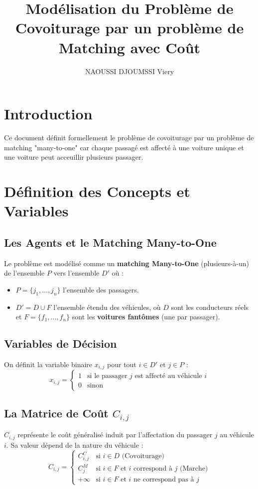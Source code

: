 \documentclass[11pt,a4paper]{article}
\title{Modélisation du Problème de Covoiturage par un problème de Matching avec Coût}
\author{NAOUSSI DJOUMSSI Viery}
\begin{document}
\maketitle

\section{Introduction}
Ce document définit formellement le problème de covoiturage par un problème de matching "many-to-one" car chaque passagé est affecté à une voiture unique et une voiture peut acceuillir plusieurs passager.
\section{Définition des Concepts et Variables}

\subsection{Les Agents et le Matching Many-to-One}
Le problème est modélisé comme un \textbf{matching Many-to-One} (plusieurs-à-un) de l'ensemble $P$ vers l'ensemble $D'$ où :
\begin{itemize}
    \item $P = \{j_1, ..., j_n\}$ l'ensemble des passagers.
    \item $D' = D \cup F$ l'ensemble étendu des véhicules, où $D$ sont les conducteurs réels et $F = \{f_1, ..., f_n\}$ sont les \textbf{voitures fantômes} (une par passager).
\end{itemize}

\subsection{Variables de Décision}
On définit la variable binaire $x_{i,j}$ pour tout $i \in D'$ et $j \in P$ :
\begin{equation}
    x_{i,j} = \begin{cases}
    1 & \text{si le passager } j \text{ est affecté au véhicule } i \\
    0 & \text{sinon}
    \end{cases}
\end{equation}

\subsection{La Matrice de Coût $C_{i,j}$}
$C_{i,j}$ représente le coût généralisé induit par l'affectation du passager $j$ au véhicule $i$. Sa valeur dépend de la nature du véhicule :
\begin{equation}
    C_{i,j} = \begin{cases}
    C^C_{i,j} & \text{si } i \in D \text{ (Covoiturage)} \\
    C^M_j & \text{si } i \in F \text{ et } i \text{ correspond à } j \text{ (Marche)} \\
    +\infty & \text{si } i \in F \text{ et } i \text{ ne correspond pas à } j
    \end{cases}
\end{equation}
\end{document}
